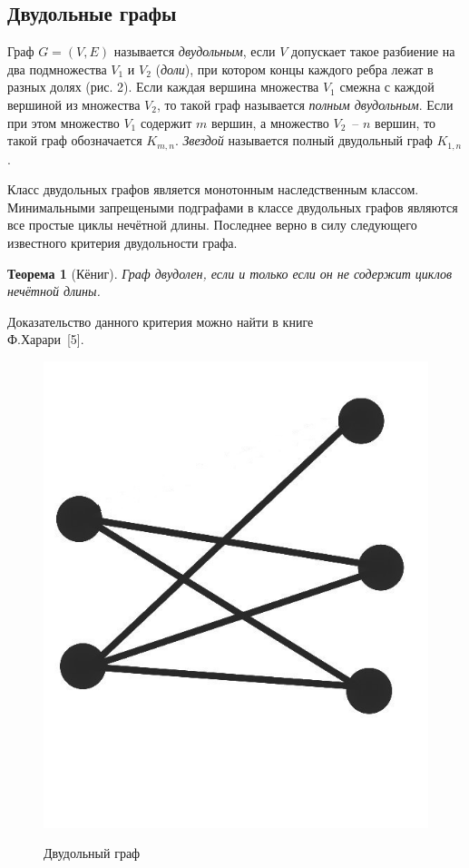 \documentclass[12pt]{article}
\newtheorem{theorem}{\hspace{1cm}Теорема}
\begin{document}
\subsection{Двудольные графы} 
 Граф $G = (V,E)$ называется {\it двудольным}, если $V$ допускает такое разбиение на два подмножества $V_1$ и $V_2$ ({\it доли}), при котором концы каждого ребра лежат в разных долях (рис. 2). Если каждая вершина множества $V_1$ смежна с каждой вершиной из множества $V_2$, то такой граф называется {\it полным двудольным}. Если при этом множество $V_1$ содержит $m$ вершин, а множество $V_2$~-- $n$ вершин, то такой граф обозначается $K_{m,n}$. {\it Звездой} называется полный двудольный граф $K_{1,n}$. 
 
 Класс двудольных графов является монотонным наследственным классом. Минимальными запрещеными подграфами в классе двудольных графов являются все простые циклы нечётной длины. Последнее верно в силу следующего известного критерия двудольности графа.

\begin{theorem}[Кёниг]
	\label{t3}
Граф двудолен, если и только если он не содержит циклов нечётной длины.
\end{theorem} 
\vspace{-3mm}
Доказательство данного критерия можно найти в книге \\Ф.Харари~[5].

\begin{figure}
\begin{center}
	\label{pic2}
	\includegraphics[scale=0.22]{dvud.jpg}
	\caption{Двудольный граф}
\end{center}
\end{figure}
\end{document}
